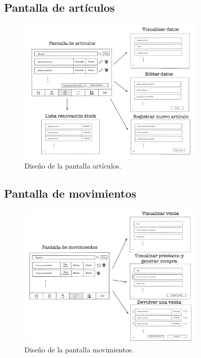 \newpage

\subsection{Pantalla de artículos}

\begin{figure}[ht]
	\centering
	\includegraphics[width=0.8\textwidth, angle=270]{imagenes/pantalla_articulos.JPG}
	\caption{Diseño de la pantalla artículos.}
	\label{fig:pantallaarticulos}
\end{figure}

\newpage


\subsection{Pantalla de movimientos}

\begin{figure}[ht]
	\centering
	\includegraphics[width=0.8\textwidth, angle=270]{imagenes/pantalla_movimientos.JPG}
	\caption{Diseño de la pantalla movimientos.}
	\label{fig:pantallamovimientos}
\end{figure}

